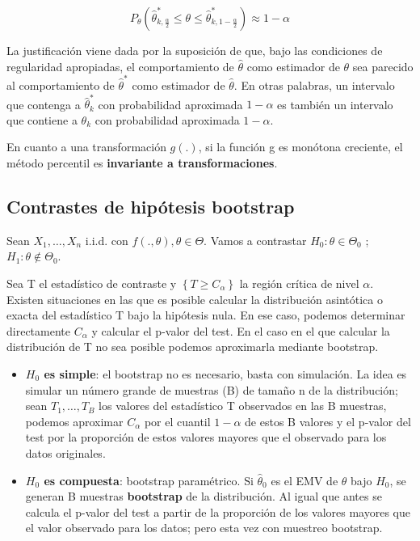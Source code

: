 $$P_\theta\left(\hat\theta^*_{k,\frac{\alpha}{2}}\leq\theta\leq\hat\theta^*_{k,1-\frac{\alpha}{2}}\right)\approx 1-\alpha$$

La justificación viene dada por la suposición de que, bajo las condiciones de regularidad apropiadas, el comportamiento de $\hat\theta$ como estimador de $\theta$ sea parecido al comportamiento de $\hat\theta^*$ como estimador de $\hat\theta$.
En otras palabras, un intervalo que contenga a $\hat\theta^*_{k}$ con probabilidad aproximada $1-\alpha$ es también un intervalo que contiene a $\theta_k$ con probabilidad aproximada $1-\alpha$.

En cuanto a una transformación $g(.)$, si la función g es monótona creciente, el método percentil es \textbf{invariante a transformaciones}.

\subsection{Contrastes de hipótesis bootstrap}

Sean $X_1,\dots,X_n$ i.i.d. con $f(.,\theta), \theta\in\Theta$. Vamos a contrastar $H_0: \theta\in\Theta_0$ ; $H_1:\theta\notin\Theta_0$.

Sea T el estadístico de contraste y $\left\{T \geq C_\alpha\right\}$ la región crítica de nivel $\alpha$. Existen situaciones en las que es posible calcular la distribución asintótica o exacta del estadístico T bajo la hipótesis nula.
En ese caso, podemos determinar directamente $C_\alpha$ y calcular el p-valor del test. En el caso en el que calcular la distribución de T no sea posible podemos aproximarla mediante bootstrap.

\begin{itemize}
    \item \textbf{$H_0$ es simple}: el bootstrap no es necesario, basta con simulación. La idea es simular un número grande de muestras (B) de tamaño n de la distribución; sean $T_1,\dots,T_B$ los valores del estadístico T observados en las B muestras, podemos aproximar $C_\alpha$ por el cuantil $1-\alpha$ de estos B valores y el p-valor del test por la proporción de estos valores mayores que el observado para los datos originales.
    \item \textbf{$H_0$ es compuesta}: bootstrap paramétrico. Si $\hat\theta_0$ es el EMV de $\theta$ bajo $H_0$, se generan B muestras \textbf{bootstrap} de la distribución. Al igual que antes se calcula el p-valor del test a partir de la proporción de los valores mayores que el valor observado para los datos; pero esta vez con muestreo bootstrap.
\end{itemize}
